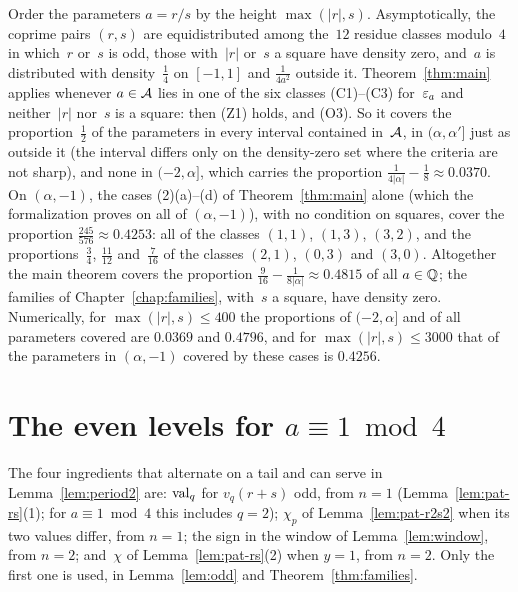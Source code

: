\begin{remark}[Density]
  \label{rem:density}
  Order the parameters $a = r/s$ by the height $\max(|r|, s)$. Asymptotically, the coprime pairs
  $(r, s)$ are equidistributed among the~$12$ residue classes modulo~$4$ in which~$r$ or~$s$ is
  odd, those with~$|r|$ or~$s$ a square have density zero, and~$a$ is distributed with
  density~$\frac14$ on $[-1, 1]$ and $\frac{1}{4a^2}$ outside it. Theorem~\ref{thm:main} applies
  whenever $a \in \mathcal{A}$ lies in one of the six classes (C1)--(C3) for~$\varepsilon_a$ and neither~$|r|$
  nor~$s$ is a square: then (Z1) holds, and (O3). So it covers the proportion~$\frac12$ of
  the parameters in every interval contained in~$\mathcal{A}$, in $(\alpha, \alpha']$ just as outside it
  (the interval differs only on the density-zero set where the criteria are not sharp), and none in
  $(-2, \alpha]$, which carries the proportion $\frac{1}{4|\alpha|} - \frac18 \approx 0.0370$.
  On $(\alpha, -1)$, the cases (2)(a)--(d) of Theorem~\ref{thm:main} alone (which the
  formalization proves on all of $(\alpha, -1)$), with no condition on squares, cover the proportion
  $\frac{245}{576} \approx 0.4253$: all of the classes $(1,1)$, $(1,3)$, $(3,2)$, and the
  proportions~$\frac34$, $\frac{11}{12}$ and~$\frac{7}{16}$ of the classes $(2,1)$, $(0,3)$ and
  $(3,0)$. Altogether the main theorem covers the proportion $\frac{9}{16} - \frac{1}{8|\alpha|}
  \approx 0.4815$ of all $a \in \mathbb{Q}$; the families of Chapter~\ref{chap:families}, with~$s$ a
  square, have density zero. Numerically, for $\max(|r|, s) \le 400$ the proportions of $(-2,
  \alpha]$ and of all parameters covered are $0.0369$ and $0.4796$, and for $\max(|r|, s) \le 3000$
  that of the parameters in $(\alpha, -1)$ covered by these cases is $0.4256$.
\end{remark}


\section{The even levels for \texorpdfstring{$a \equiv 1 \bmod 4$}{a = 1 mod 4}}

\begin{remark}
  The four ingredients that alternate on a tail and can serve in Lemma~\ref{lem:period2} are:
  $\operatorname{val}_q$ for $v_q(r + s)$ odd, from $n = 1$ (Lemma~\ref{lem:pat-rs}(1); for
  $a \equiv 1 \bmod 4$ this includes $q = 2$); $\chi_p$ of Lemma~\ref{lem:pat-r2s2} when its two
  values differ, from $n = 1$; the sign in the window of Lemma~\ref{lem:window}, from $n = 2$;
  and~$\chi$ of Lemma~\ref{lem:pat-rs}(2) when $y = 1$, from $n = 2$. Only the first one is used, in
  Lemma~\ref{lem:odd} and Theorem~\ref{thm:families}.
\end{remark}

